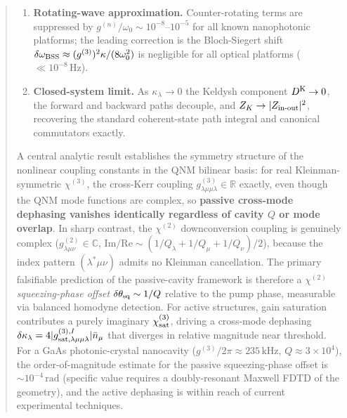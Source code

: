 \documentclass[12pt]{article}
\newcommand{\Keldysh}{{\rm K}}
\begin{document}
\begin{abstract}
\begin{enumerate}
\item \textbf{Rotating-wave approximation.}  Counter-rotating terms are
  suppressed by $g^{(n)}/\omega_0 \sim 10^{-8}$--$10^{-5}$ for all
  known nanophotonic platforms; the leading correction is the
  Bloch-Siegert shift $\delta\omega_{\rm BSS}\approx(g^{(3)})^2\kappa/(8\omega_0^2)$
  is negligible for all optical platforms ($\ll 10^{-8}\,\mathrm{Hz}$).

\item \textbf{Closed-system limit.}  As $\kappa_\lambda\to 0$ the
  Keldysh component $D^\Keldysh\to 0$, the forward and backward paths
  decouple, and $Z_K\to|Z_{\rm in\text{-}out}|^2$, recovering the
  standard coherent-state path integral and canonical commutators
  exactly.
\end{enumerate}

A central analytic result establishes the symmetry structure of the
nonlinear coupling constants in the QNM bilinear basis: for real
Kleinman-symmetric $\chi^{(3)}$, the cross-Kerr coupling
$g^{(3)}_{\lambda\mu\mu\lambda}\in\mathbb{R}$ exactly, even though the
QNM mode functions are complex, so \textbf{passive cross-mode
dephasing vanishes identically regardless of cavity $Q$ or mode
overlap}.  In sharp contrast, the $\chi^{(2)}$ downconversion coupling
is genuinely complex ($g^{(2)}_{\lambda\mu\nu}\in\mathbb{C}$,
$\mathrm{Im}/\mathrm{Re}\sim(1/Q_\lambda+1/Q_\mu+1/Q_\nu)/2$), because
the index pattern $(\lambda^*\mu\nu)$ admits no Kleinman cancellation.
The primary falsifiable prediction of the passive-cavity framework is
therefore a $\chi^{(2)}$ \emph{squeezing-phase offset}
$\delta\theta_{\rm sq}\sim 1/Q$ relative to the pump phase, measurable
via balanced homodyne detection.  For active structures, gain
saturation contributes a purely imaginary $\chi^{(3)}_{\rm sat}$,
driving a cross-mode dephasing
$\delta\kappa_\lambda=4|g^{(3),I}_{\rm sat,\lambda\mu\mu\lambda}|\bar{n}_\mu$
that diverges in relative magnitude near threshold.  For a GaAs
photonic-crystal nanocavity ($g^{(3)}/2\pi\approx 235\,\mathrm{kHz}$,
$Q\approx 3\times10^4$), the order-of-magnitude estimate for the
passive squeezing-phase offset is $\sim 10^{-4}\,\mathrm{rad}$
(specific value requires a doubly-resonant Maxwell FDTD of the
geometry), and the active dephasing is within reach of current
experimental techniques.
\end{abstract}

\tableofcontents
\newpage


\end{document}
